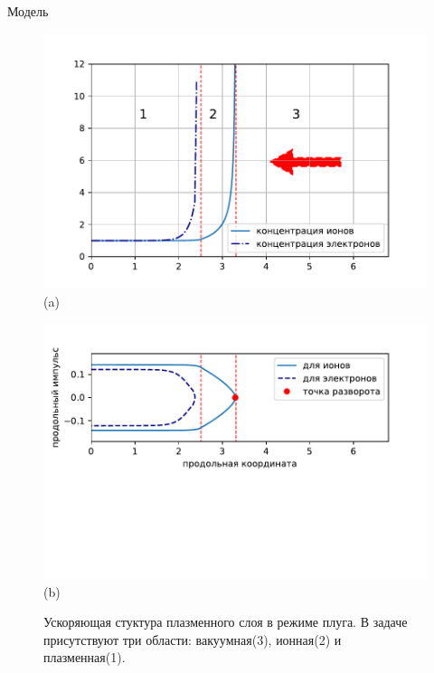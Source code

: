 \begin{frame}[t]{}
\begin{columns}[t]
\begin{column}{.48\linewidth}
\begin{block}{Модель}
\begin{enumerate}
 			\end{enumerate}
        
        \begin{figure}[h]
            \begin{minipage}{0.47\linewidth}
                \includegraphics[width=\linewidth]{pic/1jstruct.pdf}
                \centering
                (a)
            \end{minipage}
            \begin{minipage}{0.47\linewidth}
                \includegraphics[width=\linewidth]{pic/2jstruct.pdf}
                \centering
                (b)
            \end{minipage}
            
            \label{fig:spec}
            \caption{Ускоряющая стуктура плазменного слоя в режиме плуга. В задаче присутствуют три области: вакуумная(3), ионная(2) и плазменная(1). }
        \end{figure} 



\end{block}
\end{column}
\end{columns}
\end{frame}
